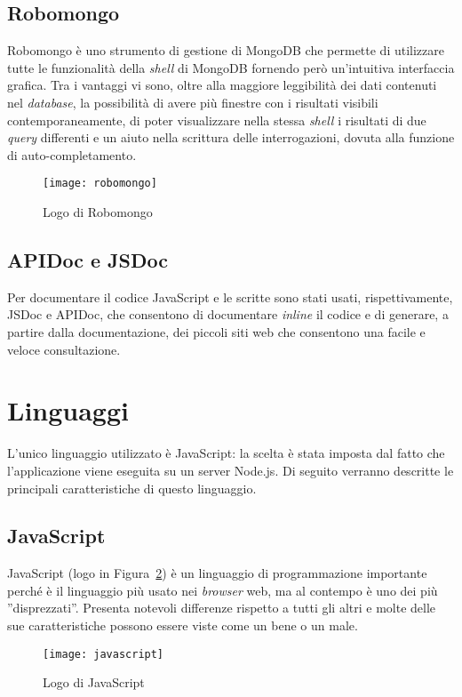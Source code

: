 \subsection{Robomongo} \label{sec:robomongo}
Robomongo è uno strumento di gestione di MongoDB che permette di utilizzare tutte le funzionalità della \textit{shell} di MongoDB fornendo però un'intuitiva interfaccia grafica. Tra i vantaggi vi sono, oltre alla maggiore leggibilità dei dati contenuti nel \textit{database}, la possibilità di avere più finestre con i risultati visibili contemporaneamente, di poter visualizzare nella stessa \textit{shell} i risultati di due \textit{query} differenti e un aiuto nella scrittura delle interrogazioni, dovuta alla funzione di auto-completamento.
\begin{figure}[hbpc]
\begin{center}
\texttt{[image: robomongo]}
\caption[Logo di Robomongo]{Logo di Robomongo\protect\footnotemark}
\label{fig:robomongo}
\end{center}
\end{figure}

\subsection{APIDoc e JSDoc}
Per documentare il codice JavaScript e le  scritte sono stati usati, rispettivamente, JSDoc e APIDoc, che consentono di documentare \textit{inline} il codice e di generare, a partire dalla documentazione, dei piccoli siti web che consentono una facile e veloce consultazione.

\section{Linguaggi}
L'unico linguaggio utilizzato è JavaScript: la scelta è stata imposta dal fatto che l'applicazione viene eseguita su un server Node.js. Di seguito verranno descritte le principali caratteristiche di questo linguaggio. 

\subsection{JavaScript}
JavaScript (logo in Figura~\ref{fig:javascript}) è un linguaggio di programmazione importante perché è il linguaggio più usato nei \textit{browser} web, ma al contempo è uno dei più ''disprezzati''. Presenta notevoli differenze rispetto a tutti gli altri e molte delle sue caratteristiche possono essere viste come un bene o un male. 
\begin{figure}[hbpc]
\begin{center}
\texttt{[image: javascript]}
\caption[Logo di JavaScript]{Logo di JavaScript\protect\footnotemark}
\label{fig:javascript}
\end{center}
\end{figure}


